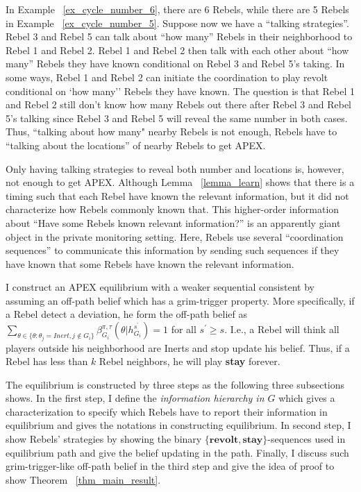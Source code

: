 \documentclass[12pt,letter]{article}
\theoremstyle{definition}
\theoremstyle{remark}
\theoremstyle{claim}
\begin{document}
In Example ~\ref{ex_cycle_number_6}, there are 6 Rebels, while there are 5 Rebels in Example ~\ref{ex_cycle_number_5}. Suppose now we have a ``talking strategies''. Rebel 3 and Rebel 5 can talk about ``how many'' Rebels in their neighborhood to Rebel 1 and Rebel 2. Rebel 1 and Rebel 2 then talk with each other about ``how many'' Rebels they have known conditional on Rebel 3 and Rebel 5's taking. In some ways, Rebel 1 and Rebel 2 can initiate the coordination to play revolt conditional on `how many'' Rebels they have known. The question is that Rebel 1 and Rebel 2 still don't know how many Rebels out there after Rebel 3 and Rebel 5's talking since Rebel 3 and Rebel 5 will reveal the same number in both cases. Thus, ``talking about how many" nearby Rebels is not enough, Rebels have to ``talking about the locations'' of nearby Rebels to get APEX. 

Only having talking strategies to reveal both number and locations is, however, not enough to get APEX. Although Lemma ~\ref{lemma_learn} shows that there is a timing such that each Rebel have known the relevant information, but it did not characterize how Rebels commonly known that. This higher-order information about ``Have some Rebels known relevant information?'' is an apparently giant object in the private monitoring setting. Here, Rebels use several ``coordination sequences'' to communicate this information by sending such sequences if they have known that some Rebels have known the relevant information.

I construct an APEX equilibrium with a weaker sequential consistent by assuming an off-path belief which has a grim-trigger property. More specifically, if a Rebel detect a deviation, he form the off-path belief as $\sum_{\theta \in \{\theta:\theta_j=Inert,j\notin G_i\}}\beta^{\pi,\tau}_{G_i}({\theta}|h^{s^{'}}_{G_i})=1$ for all $s^{'}\geq s$. I.e., a Rebel will think all players outside his neighborhood are Inerts and stop update his belief. Thus, if a Rebel has less than $k$ Rebel neighbors, he will play \textbf{stay} forever. 

The equilibrium is constructed by three steps as the following three subsections shows. In the first step, I define the \textit{information hierarchy in $G$} which gives a characterization to specify which Rebels have to report their information in equilibrium and gives the notations in constructing equilibrium. In second step, I show Rebels' strategies by showing the binary $\{\textbf{revolt},\textbf{stay}\}$-sequences used in equilibrium path and give the belief updating in the path. Finally, I discuss such grim-trigger-like off-path belief in the third step and give the idea of proof to show Theorem ~\ref{thm_main_result}. 
\end{document}
